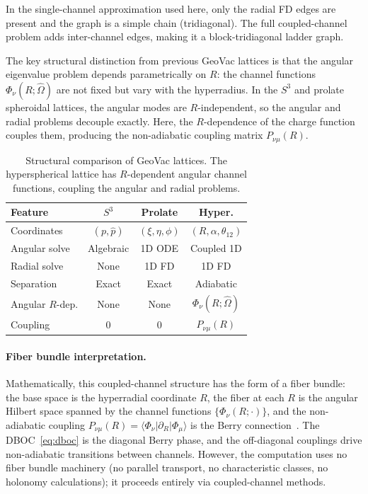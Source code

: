 \documentclass[aps,pra,twocolumn,superscriptaddress,longbibliography]{revtex4-2}
\begin{document}
In the single-channel approximation used here, only the radial FD
edges are present and the graph is a simple chain (tridiagonal).
The full coupled-channel problem adds inter-channel edges, making it
a block-tridiagonal ladder graph.

The key structural distinction from previous GeoVac lattices is that the
angular eigenvalue problem depends parametrically on $R$: the channel
functions $\Phi_\nu(R; \hat\Omega)$ are not fixed but vary with the
hyperradius.  In the $S^3$ and prolate spheroidal lattices, the angular
modes are $R$-independent, so the angular and radial problems decouple
exactly.  Here, the $R$-dependence of the charge function couples
them, producing the non-adiabatic coupling matrix $P_{\nu\mu}(R)$.

\begin{table}[b]
\caption{Structural comparison of GeoVac lattices.  The
hyperspherical lattice has $R$-dependent angular channel
functions, coupling the angular and radial problems.}
\label{tab:bundle}
\begin{ruledtabular}
\begin{tabular}{lccc}
  Feature & $S^3$ & Prolate & Hyper. \\
  \hline
  Coordinates & $(p, \hat{p})$ & $(\xi,\eta,\phi)$ &
    $(R, \alpha, \theta_{12})$ \\
  Angular solve & Algebraic & 1D ODE & Coupled 1D \\
  Radial solve & None & 1D FD & 1D FD \\
  Separation & Exact & Exact & Adiabatic \\
  Angular $R$-dep. & None & None & $\Phi_\nu(R;\hat\Omega)$ \\
  Coupling & 0 & 0 & $P_{\nu\mu}(R)$ \\
\end{tabular}
\end{ruledtabular}
\end{table}

\paragraph{Fiber bundle interpretation.}
Mathematically, this coupled-channel structure has the form of a
fiber bundle: the base space is the hyperradial coordinate $R$, the
fiber at each $R$ is the angular Hilbert space spanned by the channel
functions $\{\Phi_\nu(R;\cdot)\}$, and the non-adiabatic coupling
$P_{\nu\mu}(R) = \langle\Phi_\nu|\partial_R|\Phi_\mu\rangle$ is the
Berry connection~\cite{Berry1984, Mead1992}.  The DBOC~\eqref{eq:dboc}
is the diagonal Berry phase, and the off-diagonal couplings drive
non-adiabatic transitions between channels.  However, the computation
uses no fiber bundle machinery (no parallel transport, no characteristic
classes, no holonomy calculations); it proceeds entirely via
coupled-channel methods.
\end{document}
